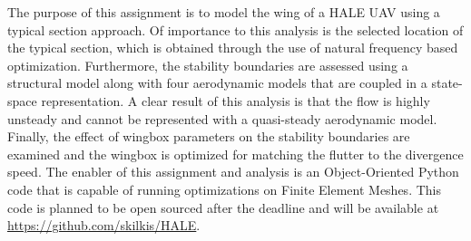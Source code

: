 The purpose of this assignment is to model the wing of a HALE UAV using a
typical section approach. Of importance to this analysis is the selected
location of the typical section, which is obtained through the use of natural
frequency based optimization. Furthermore, the stability boundaries are
assessed using a structural model along with four aerodynamic models that are
coupled in a state-space representation. A clear result of this analysis is
that the flow is highly unsteady and cannot be represented with a quasi-steady
aerodynamic model. Finally, the effect of wingbox parameters on the stability
boundaries are examined and the wingbox is optimized for matching the flutter
to the divergence speed. The enabler of this assignment and analysis is an
Object-Oriented Python code that is capable of running optimizations on Finite
Element Meshes. This code is planned to be open sourced after the deadline and
will be available at \url{https://github.com/skilkis/HALE}.
